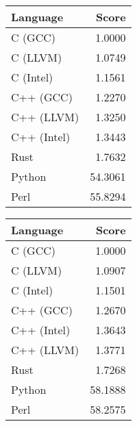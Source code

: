 \begin{subtable}{0.33\textwidth}
    \centering
    \caption{$k=3$}
    \label{table:runtime:dfa_gap(3)}
    \begin{tabular}{|l|r|}
        \hline
        Language & Score \\
        \hline
        C (GCC) & 1.0000 \\
        C (LLVM) & 1.0749 \\
        C (Intel) & 1.1561 \\
        C++ (GCC) & 1.2270 \\
        C++ (LLVM) & 1.3250 \\
        C++ (Intel) & 1.3443 \\
        Rust & 1.7632 \\
        Python & 54.3061 \\
        Perl & 55.8294 \\
        \hline
    \end{tabular}
\end{subtable}
\begin{subtable}{0.33\textwidth}
    \centering
    \caption{$k=4$}
    \label{table:runtime:dfa_gap(4)}
    \begin{tabular}{|l|r|}
        \hline
        Language & Score \\
        \hline
        C (GCC) & 1.0000 \\
        C (LLVM) & 1.0907 \\
        C (Intel) & 1.1501 \\
        C++ (GCC) & 1.2670 \\
        C++ (Intel) & 1.3643 \\
        C++ (LLVM) & 1.3771 \\
        Rust & 1.7268 \\
        Python & 58.1888 \\
        Perl & 58.2575 \\
        \hline
    \end{tabular}
\end{subtable}%
